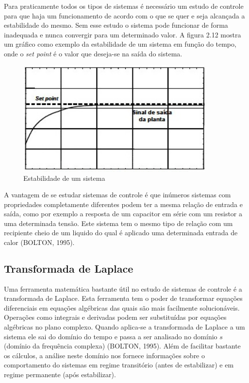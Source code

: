 Para praticamente todos os tipos de sistemas é necessário um estudo de controle para que haja um funcionamento de acordo com o que se quer e seja alcançada a estabilidade do mesmo. Sem esse estudo o sistema pode funcionar de forma inadequada e nunca convergir para um determinado valor. A figura 2.12 mostra um gráfico como exemplo da estabilidade de um sistema em função do tempo, onde o \textit{set point}  é o valor que deseja-se na saída do sistema.


\begin{figure}[!htb]

\center

\includegraphics[width=10cm]{imagens/estabilidade_sistema.jpg}

\label{Estabilidade de um sistema}

\caption{Estabilidade de um sistema}

\end{figure}

A vantagem de se estudar sistemas de controle é que inúmeros sistemas com propriedades completamente diferentes podem ter a mesma relação de entrada e saída, como por exemplo a resposta de um capacitor em série com um resistor a uma determinada tensão. Este sistema tem o mesmo tipo de relação com um recipiente cheio de um liquido do qual é aplicado uma determinada entrada de calor (BOLTON, 1995). 

\subsection{Transformada de Laplace}

Uma ferramenta matemática bastante útil no estudo de sistemas de controle é a transformada de Laplace. Esta ferramenta tem o poder de transformar equações diferenciais em equações algébricas das quais são mais facilmente solucionáveis. Operações como integrais e derivadas podem ser substituídas por equações algébricas no plano complexo.  Quando aplica-se a transformada de Laplace a um sistema ele sai do domínio do tempo e passa a ser analisado no domínio $s$ (domínio da frequência complexa)  (BOLTON, 1995). Além de facilitar bastante os cálculos, a análise neste domínio nos fornece informações sobre o comportamento do sistemas em regime transitório (antes de estabilizar) e em regime permanente (após estabilizar).

